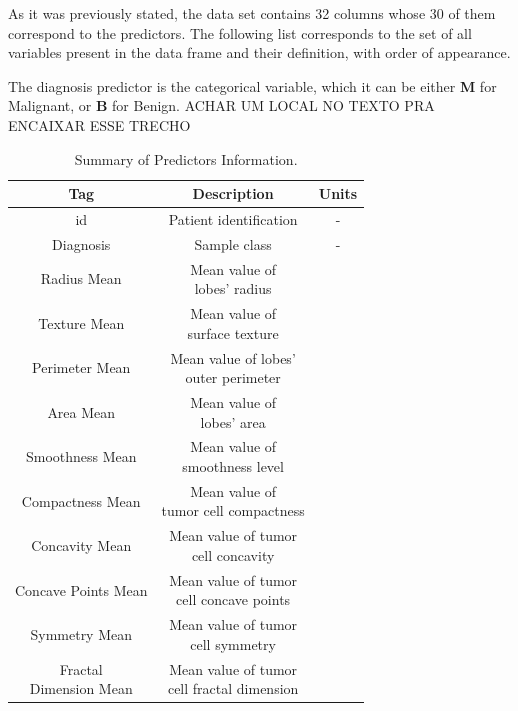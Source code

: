 \documentclass[conference]{IEEEtran}
\newcommand{\reviewUrgent}[1]{{\color{red} #1}} %
\begin{document}
As it was previously stated, the data set contains 32 columns whose 30 of them 
correspond to the predictors. The following list corresponds to the set of all 
variables present in the data frame and their definition, with order of appearance. 

The diagnosis predictor is the categorical variable, which it can be either \textbf{M} for Malignant, or \textbf{B} for Benign. 
\reviewUrgent{ACHAR UM LOCAL NO TEXTO PRA ENCAIXAR ESSE TRECHO}

\begin{table}[htbp]
\caption{Summary of Predictors Information.}
\begin{center}
\begin{tabular}{|c|c|c|}
    \hline
    \cline{2-3} 
    Tag & Description & Units \\
    \hline
    id & Patient identification & - \\
    \hline
    Diagnosis & Sample class & - \\
    \hline
    Radius Mean & \makecell{Mean value of \\ lobes' radius} &  \\
    \hline
    Texture Mean & \makecell{Mean value of \\ surface texture} &  \\
    \hline
    Perimeter Mean & \makecell{Mean value of lobes' \\ outer perimeter}  &  \\
    \hline
    Area Mean & \makecell{Mean value of \\ lobes' area} &  \\
    \hline
    Smoothness Mean & \makecell{Mean value of \\ smoothness level} &  \\
    \hline
    Compactness Mean & \makecell{Mean value of \\ tumor cell compactness} &  \\
    \hline
    Concavity Mean & \makecell{Mean value of tumor \\ cell concavity} &  \\
    \hline
    Concave Points Mean &  \makecell{Mean value of tumor\\ cell concave points} &  \\
    \hline
    Symmetry Mean & \makecell{Mean value of tumor\\ cell symmetry} &  \\
    \hline
    \makecell{Fractal \\ Dimension Mean} & \makecell{Mean value of tumor \\ cell fractal dimension} &  \\

\end{tabular}
\end{center}
\end{table}
\end{document}
